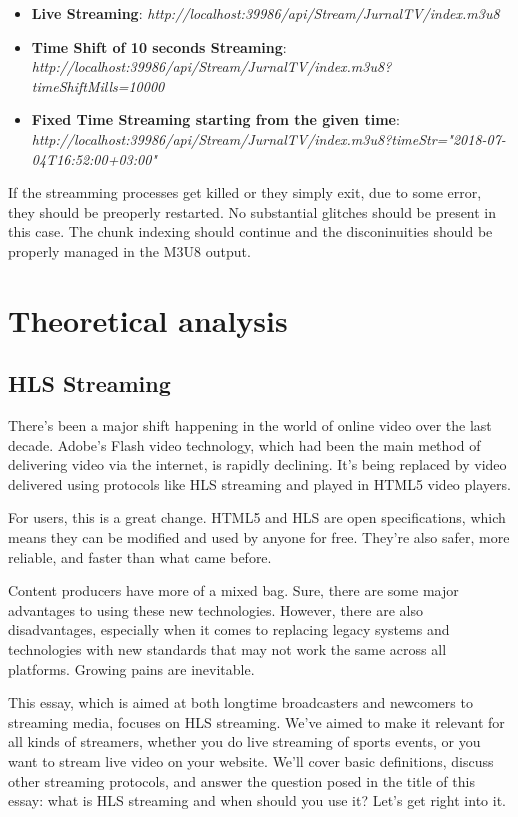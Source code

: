 \documentclass{article}
\begin{document}
			\begin{itemize}
				\item \textbf{Live Streaming}: \textit{http://localhost:39986/api/Stream/JurnalTV/index.m3u8}
				\item \textbf{Time Shift of 10 seconds Streaming}: \textit{http://localhost:39986/api/Stream/JurnalTV/index.m3u8?timeShiftMills=10000}
				\item \textbf{Fixed Time Streaming starting from the given time}: \textit{http://localhost:39986/api/Stream/JurnalTV/index.m3u8?timeStr="2018-07-04T16:52:00+03:00"}
			\end{itemize}

			If the streamming processes get killed or they simply exit, due to some error, they should be preoperly restarted. No substantial glitches should be present in this case. The chunk indexing should continue and the disconinuities should be properly managed in the M3U8 output.

	\newpage
	\section{Theoretical analysis}
		\subsection{HLS Streaming}
			There’s been a major shift happening in the world of online video over the last decade. Adobe’s Flash video technology, which had been the main method of delivering video via the internet, is rapidly declining. It’s being replaced by video delivered using protocols like HLS streaming and played in HTML5 video players.

			For users, this is a great change. HTML5 and HLS are open specifications, which means they can be modified and used by anyone for free. They’re also safer, more reliable, and faster than what came before.

			Content producers have more of a mixed bag. Sure, there are some major advantages to using these new technologies. However, there are also disadvantages, especially when it comes to replacing legacy systems and technologies with new standards that may not work the same across all platforms. Growing pains are inevitable.

			This essay, which is aimed at both longtime broadcasters and newcomers to streaming media, focuses on HLS streaming. We’ve aimed to make it relevant for all kinds of streamers, whether you do live streaming of sports events, or you want to stream live video on your website. We’ll cover basic definitions, discuss other streaming protocols, and answer the question posed in the title of this essay: what is HLS streaming and when should you use it? Let’s get right into it.
\end{document}
